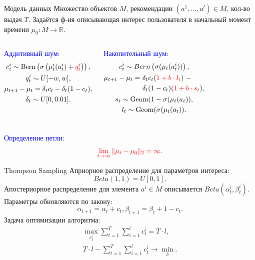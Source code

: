 \documentclass{beamer}
\begin{document}
\begin{frame}{Модель данных}
  Множество объектов $M$, рекомендации $(a^1, \dots, a^l) \in M$, кол-во выдач $T$.
  Задаётся ф-ия описывающая интерес пользователя  в начальный момент времени $\mu_0 : M \to \mathbb{R}$.

\bigskip

\begin{columns}[T]
\textcolor{blue}{Аддитивный шум:}   
\begin{gather*}
    c_t^i \sim \text{Bern} \left(\sigma\left(\mu_t^i (a_t^i) + \mathbin{\color{red} q_t^i } \right) \right), \\ 
    q_t^i \sim U[-w, w], \\
\mu_{t+1} - \mu_{t} = \delta_t c_t - \delta_t (1 - c_t), \\
\delta_t \sim U[0, 0.01].
  \end{gather*}

\textcolor{blue}{Накопительный шум:}   
\begin{gather*}
  c_t^i \sim Bern \left(\sigma(\mu_t(a_t^i)) \right), \\
  \begin{align*}
    \mu_{t+1} - \mu_{t} =~&\delta_t c_t (\mathbin{ \color{red} 1 + b \cdot l_t})~- \\ 
                        &\delta_t (1 - c_t) (\mathbin{ \color{red} 1 + b \cdot s_t}),
\end{align*} \\
  s_t \sim \text{Geom}(1 - \sigma(\mu_t(a_t)), \\
  l_t \sim \text{Geom}(\sigma(\mu_t(a_t)). 
\end{gather*}
\end{columns}
\bigskip
\textcolor{blue}{Определение петли}:
\begin{gather*}
  \color{red} \lim_{t \to \infty} \|\mu_t - \mu_0 \|_2 = \infty.
\end{gather*}
\end{frame}
\begin{frame}{Thompson Sampling}
Априорное распределение для параметров интереса: 
\[Beta(1, 1) = U[0, 1].\] 
Апостериорное распределение для элемента $a^i \in M$ описывается $Beta(\alpha_t^i, \beta_t^i)$. 
Параметры обновляются по закону:
\[\alpha_{t+1} = \alpha_t + c_t, \beta_{t+1} = \beta_t + 1 - c_t.\]
Задача оптимизации алгоритма:
\begin{gather*}  
\max_{c_t^i} \sum_{t = 1}^T \sum_{i = 1}^l c_t^i = T \cdot l,\\ 
   T \cdot l - \sum_{t = 1}^T \sum_{i = 1}^l c_t^i \to \min_{b}. 
\end{gather*}
\end{frame}
\end{document}
